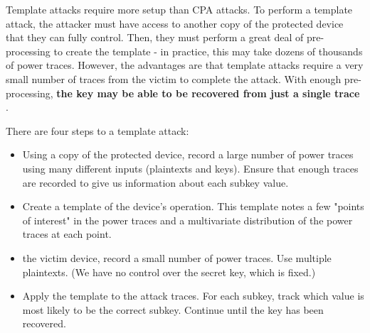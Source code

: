\documentclass{report}
\begin{document}
    Template attacks require more setup than CPA attacks. To perform a template attack, the attacker must have access to another copy of the protected device that they can fully control. Then, they must perform a great deal of pre-processing to create the template - in practice, this may take dozens of thousands of power traces. However, the advantages are that template attacks require a very small number of traces from the victim to complete the attack. With enough pre-processing, \textbf{the key may be able to be recovered from just a single trace} .
    
    
    There are four steps to a template attack:
    \begin{itemize}
      \item Using a copy of the protected device, record a large number of power traces using many different inputs (plaintexts and keys). Ensure that enough traces are recorded to give us information about each subkey value.
      \item Create a template of the device's operation. This template notes a few "points of interest" in the power traces and a multivariate distribution of the power traces at each point.
      \item the victim device, record a small number of power traces. Use multiple plaintexts. (We have no control over the secret key, which is fixed.)
      \item Apply the template to the attack traces. For each subkey, track which value is most likely to be the correct subkey. Continue until the key has been recovered.
    \end{itemize}
    
\end{document}
